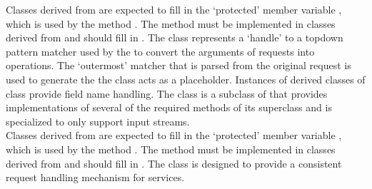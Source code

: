 Classes derived from  are expected to fill in the
`protected' member variable , which
is used by the method .
The method  must be implemented in classes derived from
 and should fill in
.
The  class represents a `handle' to a top\longDash{}down
pattern matcher used by the  to convert
the arguments of  requests into
 operations.
The `outermost' matcher that is parsed from the original request is used to generate the
 \longDash{} the  class acts as a
placeholder.
Instances of derived classes of  class provide
field name handling.
The  class is a subclass of
 that provides implementations of several of
the required methods of its superclass and is specialized to only support input streams.\\

Classes derived from  are expected to fill in the
`protected' member variable , which is used by the
method .
The method  must be implemented in classes derived from
 and should fill in
.
The  class is designed to provide a consistent
request handling mechanism for \mplusm{} services.\\

